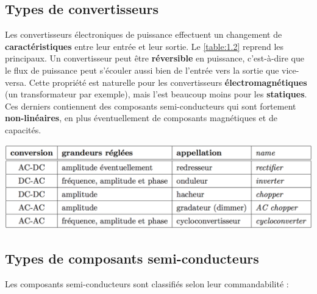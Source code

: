 	\subsection{Types de convertisseurs}
		Les convertisseurs électroniques de puissance effectuent un changement de \textbf{caractéristiques} entre leur entrée et leur sortie. Le \autoref{table:1.2} reprend les principaux. Un convertisseur peut être \textbf{réversible} en puissance, c'est-à-dire que le flux de puissance peut s'écouler aussi bien de l'entrée vers la sortie que vice-versa. Cette propriété est naturelle pour les convertisseurs \textbf{électromagnétiques} (un transformateur par exemple), mais l'est beaucoup moins pour les \textbf{statiques}. Ces derniers contiennent des composants semi-conducteurs qui sont fortement \textbf{non-linéaires}, en plus éventuellement de composants magnétiques et de capacités. 
		
		\begin{center}
			\includegraphics[scale=0.5]{ch1/2}
			\label{table:1.2}
		\end{center}
		
	\subsection{Types de composants semi-conducteurs}
		Les composants semi-conducteurs sont classifiés selon leur commandabilité : 
		
